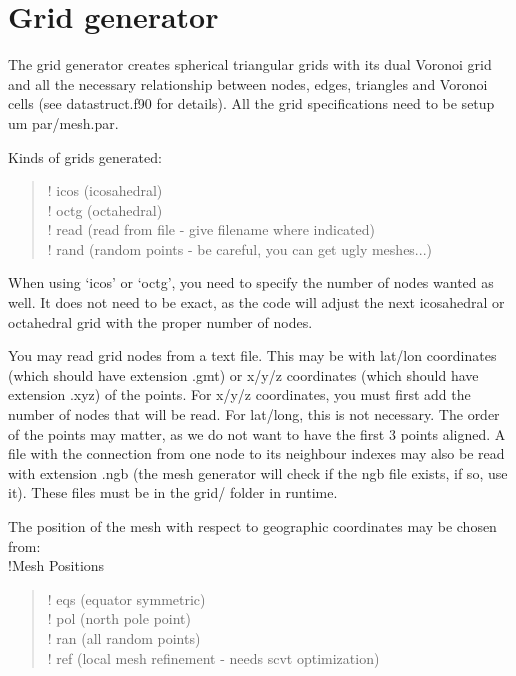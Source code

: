 \documentclass[a4paper,10pt]{article}
\begin{document}
\section{Grid generator}

The grid generator creates spherical triangular grids with its dual Voronoi grid and all the necessary relationship between nodes, edges, triangles and Voronoi cells (see datastruct.f90 for details). All the grid specifications need to be setup um par/mesh.par.

Kinds of grids generated:\\
\begin{verse}
!   icos (icosahedral) \\
!   octg (octahedral) \\
!   read (read from file - give filename where indicated) \\
!   rand (random points - be careful, you can get ugly meshes...) \\
\end{verse}

When using `icos' or `octg', you need to specify the number of nodes wanted as well. It does not need to be exact, as the code will adjust the next icosahedral or octahedral grid with the proper number of nodes.

You may read grid nodes from a text file. This may be with lat/lon  coordinates (which should have extension .gmt) or x/y/z coordinates (which should have extension .xyz) of the points. For x/y/z coordinates, you must first add the number of nodes that will be read. For lat/long, this is not necessary. The order of the points may matter, as we do not want to have the first 3 points aligned. A file with the connection from one node to its neighbour indexes may also be read with extension .ngb (the mesh generator will check if the ngb file exists, if so, use it). These files must be in the grid/ folder in runtime.

The position of the mesh with respect to geographic coordinates may be chosen from:\\
!Mesh Positions \\
\begin{verse}
!  eqs (equator symmetric)\\
!  pol (north pole point)\\
!  ran (all random points)\\
!  ref (local mesh refinement - needs scvt optimization)\\
\end{verse}
\end{document}
